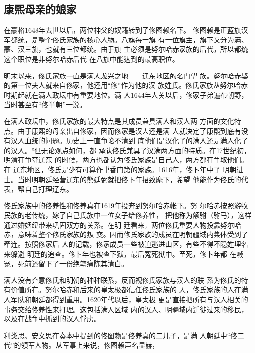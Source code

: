 \subsection{康熙母亲的娘家}
\par
在豪格1648年去世以后，两位神父的奴籍转到了佟图赖名下。%
佟图赖是正蓝旗汉军都统，是整个佟氏家族的核心人物。八旗每一旗%
有一位旗主，旗下又分为满、蒙、汉三旗，也就有三位都统。由于旗%
主必须是努尔哈赤家族的后代，所以都统这个职位是非努尔哈赤后代%
在八旗中能达到的最高职位。%
\par
明末以来，佟氏家族一直是满人龙兴之地——辽东地区的名门望%
族。努尔哈赤娶的第一位夫人就来自佟家，他还用“佟”作为他的汉%
族姓氏。佟氏家族从努尔哈赤时期起就在满人政坛中有重要地位。满%
人1644年人关以后，佟家子弟遍布朝野，当时甚至有“佟半朝”一说。%
\par
在满人政坛中，佟氏家族的最大特点是其成员兼具满人和汉人两%
方面的文化特点。由于康熙的母亲出自佟家，因而佟家是汉人还是满%
人就决定了康熙到底有没有汉人血统的问题。历史上一直争论不清到%
底他们是汉化了的满人还是满人化了的汉人。°但无论观点如何，都%
承认佟氏兼具了汉满两方面的特质。在17世纪初，明清在争夺辽东%
的时候，两方也都认为佟氏家族是自己人，两方都在争取他们。在%
辽东地区，佟氏是少有可算作书香门第的家族。1616年，佟卜年中了%
明朝进士。当时明朝廷经营辽东的熊廷弼就把佟卜年招致麾下，希望%
他能作为佟氏的代表，帮自己打理辽东。%
\par
佟氏家族中的佟养性和佟养真在1619年投奔到努尔哈赤帐下。努%
尔哈赤按照游牧民族的老传统，嫁了自己氏族中一位女子给佟养性，%
把他称为额驸（驸马），这样通过婚姻纽带来巩固双方的关系。在明%
廷看来，两位佟氏重要人物投靠努尔哈赤，意味着整个佟氏家族的叛%
变。因而佟氏家族的成员在明朝疆域内集体受到了牵连。按照佟家后%
人的记载，佟家成员一些被迫逃进山区，有些不得不隐姓埋名来躲避%
明廷的追查。佟卜年也被查下狱，最后冤死狱中。至死，佟卜年都%
在喊冤，死前还留下了一份绝笔痛陈其清白。%
\par
满人没有介意佟氏和明朝的种种联系，反而视佟氏家族与汉人的联%
系为佟氏的特有价值所在。努尔哈赤和后来的皇太极都信任佟氏家族的%
人，佟氏家族的人在满人军队和朝廷都得到重用。1620年代以后，皇太极%
更是直接把所有与汉人相关的事务交给佟养性来打理。这包括满人区域%
内的汉人、明疆域内迁徙过来的移民，以及在战争中抓到的汉人俘虏。%
\par
利类思、安文思在奏本中提到的佟图赖是佟养真的二儿子，是满%
人朝廷中“佟二代”的领军人物。从军事上来说，佟图赖声名显赫，%
